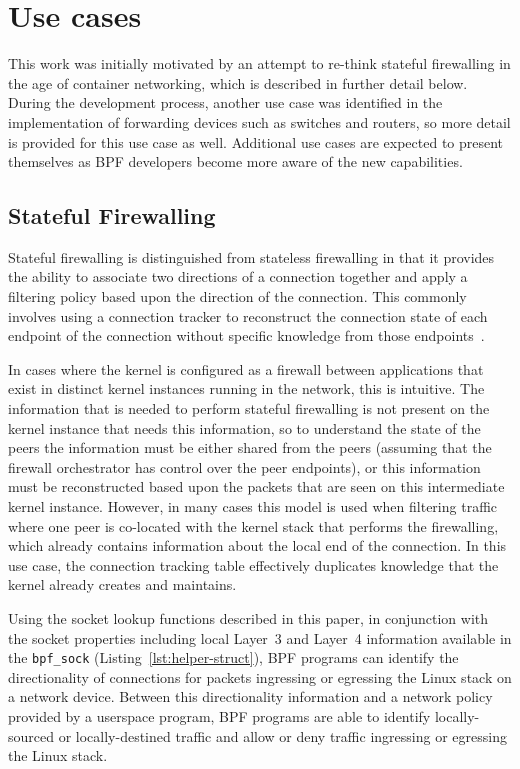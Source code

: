\documentclass[10pt,sigconf,authorversion]{lpc}
\newcommand\todo[1]{\textcolor{red}{#1}}
\begin{document}

\section{Use cases}

This work was initially motivated by an attempt to re-think stateful
firewalling in the age of container networking, which is described in further
detail below. During the development process, another use case was identified
in the implementation of forwarding devices such as switches and routers, so
more detail is provided for this use case as well. Additional use cases are
expected to present themselves as BPF developers become more aware of the new
capabilities.

\subsection{Stateful Firewalling}

Stateful firewalling is distinguished from stateless firewalling in that it
provides the ability to associate two directions of a connection together and
apply a filtering policy based upon the direction of the connection. This
commonly involves using a connection tracker to reconstruct the connection
state of each endpoint of the connection without specific knowledge from those
endpoints~\cite{conntrack,ovs-ct}.

In cases where the kernel is configured as a firewall between applications that
exist in distinct kernel instances running in the network, this is intuitive.
The information that is needed to perform stateful firewalling is not present
on the kernel instance that needs this information, so to understand the state
of the peers the information must be either shared from the peers (assuming
that the firewall orchestrator has control over the peer endpoints), or this
information must be reconstructed based upon the packets that are seen on this
intermediate kernel instance. However, in many cases this model is used when
filtering traffic where one peer is co-located with the kernel stack that
performs the firewalling, which already contains information about the local
end of the connection. In this use case, the connection tracking table
effectively duplicates knowledge that the kernel already creates and maintains.

Using the socket lookup functions described in this paper, in conjunction with
the socket properties including local Layer~3 and Layer~4 information available
in the \verb+bpf_sock+ (Listing~\ref{lst:helper-struct}), BPF programs can
identify the directionality of connections for packets ingressing or egressing
the Linux stack on a network device. Between this directionality information
and a network policy provided by a userspace program, BPF programs are able to
identify locally-sourced or locally-destined traffic and allow or deny traffic
ingressing or egressing the Linux stack.
\end{document}
